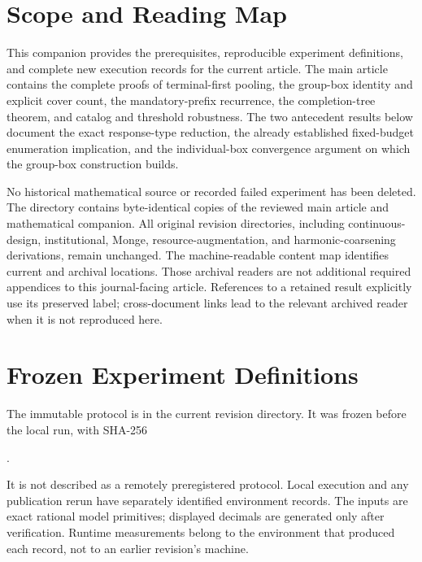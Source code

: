 \section{Scope and Reading Map}\label{sec:r51-map}
This companion provides the prerequisites, reproducible experiment definitions, and complete new execution records for the current article. The main article contains the complete proofs of terminal-first pooling, the group-box identity and explicit cover count, the mandatory-prefix recurrence, the completion-tree theorem, and catalog and threshold robustness. The two antecedent results below document the exact response-type reduction, the already established fixed-budget enumeration implication, and the individual-box convergence argument on which the group-box construction builds.

No historical mathematical source or recorded failed experiment has been deleted. The directory  contains byte-identical copies of the reviewed main article and mathematical companion. All original revision directories, including continuous-design, institutional, Monge, resource-augmentation, and harmonic-coarsening derivations, remain unchanged. The machine-readable content map identifies current and archival locations. Those archival readers are not additional required appendices to this journal-facing article. References to a retained result explicitly use its preserved label; cross-document links lead to the relevant archived reader when it is not reproduced here.




\section{Frozen Experiment Definitions}\label{sec:r51-protocol}
The immutable protocol is  in the current revision directory. It was frozen before the local run, with SHA-256
\begin{center}\small{}.\end{center}
It is not described as a remotely preregistered protocol. Local execution and any publication rerun have separately identified environment records. The inputs are exact rational model primitives; displayed decimals are generated only after verification. Runtime measurements belong to the environment that produced each record, not to an earlier revision's machine.

